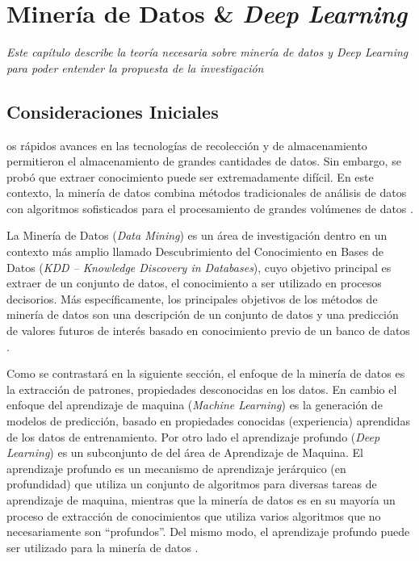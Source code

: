  
\let\textcircled=\pgftextcircled
\chapter{Minería de Datos \& \textit{Deep Learning}} {\textit{Este capítulo describe la teoría necesaria sobre   minería de datos y \textit{Deep Learning} para poder entender la propuesta de la investigación}}
\label{cap:deep_learning}



\section{Consideraciones Iniciales}

os rápidos avances en las tecnologías de recolección y de almacenamiento permitieron el almacenamiento de grandes cantidades de datos. Sin embargo, se probó que extraer conocimiento puede ser extremadamente difícil. En este contexto, la minería de datos combina métodos tradicionales de análisis de datos con algoritmos sofisticados para el procesamiento de grandes volúmenes de datos \cite{Tan:2005:IDM:1095618}.

La Minería de Datos (\textit{Data Mining}) es un área de investigación dentro en un contexto más amplio llamado Descubrimiento del Conocimiento en Bases de Datos (\textit{KDD – Knowledge Discovery in Databases}), cuyo objetivo principal es extraer de un conjunto de datos, el conocimiento a ser utilizado en procesos decisorios. Más específicamente, los principales objetivos de los métodos de minería de datos son una descripción de un conjunto de datos y una predicción de valores futuros de interés basado en conocimiento previo de un banco de datos \cite{Fayyad:1996:DMK:257938.257942}.


Como se contrastará   en la siguiente sección,  el enfoque de la minería de datos es  la extracción de patrones, propiedades desconocidas en los datos. En cambio el enfoque del aprendizaje de maquina (\textit{Machine Learning}) es la generación  de modelos de predicción, basado en propiedades conocidas (experiencia) aprendidas de los datos de entrenamiento.   Por otro lado el aprendizaje profundo (\textit{Deep Learning}) es un subconjunto de  del área de Aprendizaje de Maquina. El aprendizaje profundo es un mecanismo de aprendizaje jerárquico (en profundidad) que utiliza un conjunto de algoritmos para diversas tareas de aprendizaje de maquina, mientras que la minería de datos es en su mayoría un proceso de extracción de conocimientos que utiliza varios algoritmos que no necesariamente son ``profundos''. Del mismo modo, el aprendizaje profundo puede ser utilizado para la minería de datos \cite{dlBook, TheDLBook}. 
 
